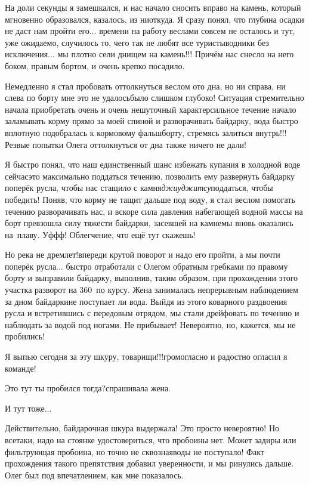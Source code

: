 На доли секунды я замешкался, и нас начало сносить вправо на камень, который мгновенно образовался, казалось, из ниоткуда. Я сразу понял, что глубина осадки не даст нам пройти его$\ldots$ времени на работу веслами совсем не осталось и тут, уже ожидаемо, случилось то, чего так не любят все туристы\sdash водники без исключения$\ldots$ мы плотно сели днищем на камень!!! Причём нас снесло на него боком, правым бортом, и очень крепко посадило. 

Немедленно я стал пробовать оттолкнуться веслом ото дна, но ни справа, ни слева по борту мне это не удалось\mdash было слишком глубоко! Ситуация стремительно начала приобретать очень и очень нешуточный характер\mdash сильное течение начало заламывать корму прямо за моей спиной и разворачивать байдарку, вода быстро вплотную подобралась к кормовому фальшборту, стремясь залиться внутрь!!! Резвые попытки Олега оттолкнуться от дна также ничего не дали! 

Я быстро понял, что наш единственный шанс избежать купания в холодной воде сейчас\mdash это максимально поддаться течению, позволить ему развернуть байдарку поперёк русла, чтобы нас стащило с камня\mdash \textit{джиу\sdash джитсу}\mdash поддаться, чтобы победить! Поняв, что корму не тащит дальше под воду, я стал веслом помогать течению разворачивать нас, и вскоре сила давления набегающей водной массы на борт превзошла силу тяжести байдарки, засевшей на камне\mdash мы вновь оказались на~плаву. Уф\sdash ф\sdash ф! Облегчение, что ещё тут скажешь! 

Но река не дремлет!\mdash впереди крутой поворот и надо его пройти, а мы почти поперёк русла$\ldots$ быстро отработали с Олегом обратным гребками по правому борту и выправили байдарку, выполнив, таким образом, при прохождении этого участка разворот на 360\degree~по курсу. Жена занималась непрерывным наблюдением за дном байдарки\mdash не поступает ли вода. Выйдя из этого коварного раздвоения русла и встретившись с передовым отрядом, мы стали дрейфовать по течению и наблюдать за водой под ногами. Не прибывает! Невероятно, но, кажется, мы не пробились! 

\diagdash Я выпью сегодня за эту шкуру, товарищи!!!\mdash громогласно и радостно огласил я команде!
 
\diagdash Это тут ты пробился тогда?\mdash спрашивала жена.

\diagdash И тут тоже$\ldots$

Действительно, байдарочная шкура выдержала! Это просто невероятно! Но все\sdash таки, надо на стоянке удостовериться, что пробоины нет. Может задиры или фильтрующая пробоина, но точно не сквозная\mdash воды не поступало! Факт прохождения такого препятствия добавил уверенности, и мы ринулись дальше. Олег был под впечатлением, как мне показалось.

